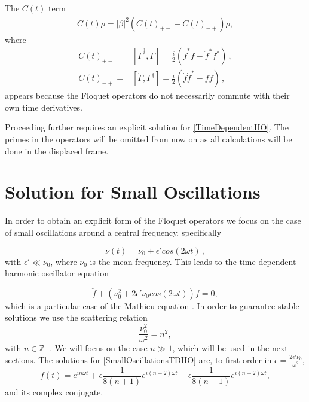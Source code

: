 \documentclass[reprint, amsmath,amssymb, aps,pra]{revtex4-1}
\begin{document}
The $C(t)$ term
 \begin{align}
C(t)\rho = |\beta|^2(C(t)_{+-} - C(t)_{-+})\rho \nonumber,
 \end{align}
 where
\begin{align*}
C(t)_{+-} =& [\dot{\Gamma}^{\dagger}, \Gamma]=\frac{i}{2}(\dot{f}^*
             \dot{f} - \ddot{f}^*f^*)\, ,\\
C(t)_{-+} =& [\dot{\Gamma}, \Gamma^{\dagger}]=\frac{i}{2}(\dot{f}
             \dot{f}^* - \ddot{f}f)\,,
\end{align*}
appears because the Floquet operators do not necessarily commute with
their own time derivatives.

Proceeding further requires an explicit solution for
\eqref{TimeDependentHO}. The primes in the operators will be omitted
from now on as all calculations will be done in the displaced frame.


\section{Solution for Small Oscillations}\label{SolSmallOsc}
 
In order to obtain an explicit form of the Floquet operators we focus
on the case of small oscillations around a central frequency,
specifically

\begin{equation}
\nu(t) = \nu_0 + \epsilon' cos(2\omega t)\, ,
\end{equation}
with $\epsilon' \ll \nu_0$, where $\nu_0$ is the mean frequency. This
leads to the time-dependent harmonic oscillator equation

\begin{equation}\label{SmallOscillationsTDHO}
\ddot{f} + (\nu_0^2 + 2\epsilon' \nu_0 cos(2\omega t))f = 0,
\end{equation}
which is a particular case of the Mathieu equation \cite{PiatekME}.
In order to guarantee stable solutions we use the scattering
relation
\begin{equation}
\frac{\nu_0^2}{\omega^2} = n^2,\label{scattering}
\end{equation}
with $n \in \mathbb{Z}^+$\cite{WardFT}. We will focus on the case
$n\gg 1$, which will be used in the next sections. The solutions for
\eqref{SmallOscillationsTDHO} are, to first order in
$\epsilon= \frac{2\epsilon' \nu_0}{\omega^2}$,
\begin{equation}\label{SmallOscillationsSolution}
f(t)=  e^{in\omega t}  + \epsilon \frac{1}{8(n+1)} e^{i(n+2)\omega t} - \epsilon \frac{1}{8(n-1)} e^{i(n-2)\omega t},
\end{equation} and its complex conjugate.
\end{document}
